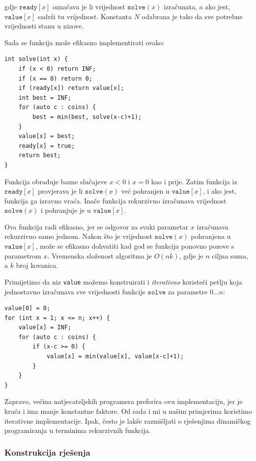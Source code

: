 gdje $\texttt{ready}[x]$ označava
je li vrijednost $\texttt{solve}(x)$ izračunata,
a ako jest, $\texttt{value}[x]$
sadrži tu vrijednost.
Konstanta $N$ odabrana je tako
da sve potrebne vrijednosti stanu u nizove.

Sada se funkcija može efikasno
implementirati ovako:

\begin{lstlisting}
int solve(int x) {
    if (x < 0) return INF;
    if (x == 0) return 0;
    if (ready[x]) return value[x];
    int best = INF;
    for (auto c : coins) {
        best = min(best, solve(x-c)+1);
    }
    value[x] = best;
    ready[x] = true;
    return best;
}
\end{lstlisting}

Funkcija obrađuje bazne slučajeve
$x<0$ i $x=0$ kao i prije.
Zatim funkcija iz
$\texttt{ready}[x]$ provjerava je li
$\texttt{solve}(x)$ već pohranjen
u $\texttt{value}[x]$,
i ako jest, funkcija ga izravno vraća.
Inače funkcija rekurzivno izračunava vrijednost
$\texttt{solve}(x)$
i pohranjuje je u $\texttt{value}[x]$.

Ova funkcija radi efikasno,
jer se odgovor za svaki parametar $x$
izračunava rekurzivno samo jednom.
Nakon što je vrijednost $\texttt{solve}(x)$ pohranjena u $\texttt{value}[x]$,
može se efikasno dohvatiti kad god se
funkcija ponovno pozove s parametrom $x$.
Vremenska složenost algoritma je $O(nk)$,
gdje je $n$ ciljna suma, a $k$ broj kovanica.

Primijetimo da niz \texttt{value} možemo
konstruirati i \emph{iterativno} koristeći
petlju koja jednostavno izračunava sve vrijednosti
funkcije $\texttt{solve}$ za parametre $0 \ldots n$:
\begin{lstlisting}
value[0] = 0;
for (int x = 1; x <= n; x++) {
    value[x] = INF;
    for (auto c : coins) {
        if (x-c >= 0) {
            value[x] = min(value[x], value[x-c]+1);
        }
    }
}
\end{lstlisting}

Zapravo, većina natjecateljskih programera preferira ovu
implementaciju, jer je kraća i ima
manje konstantne faktore.
Od sada i mi u našim primjerima koristimo
iterativne implementacije.
Ipak, često je lakše razmišljati o
rješenjima dinamičkog programiranja
u terminima rekurzivnih funkcija.


\subsubsection{Konstrukcija rješenja}

